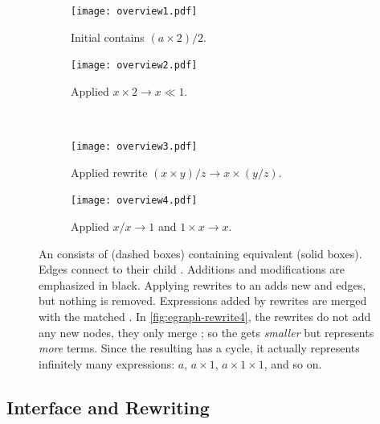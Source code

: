 \begin{figure}
  \begin{subfigure}[t]{0.45\linewidth}
    \centering
    \texttt{[image: overview1.pdf]}
    \caption{Initial \egraph contains ${(a \times 2) / 2}$.}
    \label{fig:egraph-rewrite1}
  \end{subfigure}
  \hfill
  \begin{subfigure}[t]{0.45\linewidth}
    \centering
    \texttt{[image: overview2.pdf]}
    \caption{
      Applied ${x \times 2 \to x \ll 1}$.
    }\label{fig:egraph-rewrite2}
  \end{subfigure}
  \\[1em]
  \begin{subfigure}[t]{0.45\linewidth}
    \centering
    \texttt{[image: overview3.pdf]}
    \caption{
      Applied rewrite ${(x \times y) / z \to x \times (y / z)}$.
    }\label{fig:egraph-rewrite3}
  \end{subfigure}
  \hfill
  \begin{subfigure}[t]{0.45\linewidth}
    \centering
    \texttt{[image: overview4.pdf]}
    \caption{
      Applied ${x / x \to 1}$ and ${1 \times x \to x}$.
    }\label{fig:egraph-rewrite4}
  \end{subfigure}
  \caption{
    An \egraph consists of \eclasses (dashed boxes) containing
      equivalent \enodes (solid boxes).
    Edges connect \enodes to their child \eclasses.
    Additions and modifications are emphasized in black.
    Applying rewrites to an \egraph adds new \enodes and edges,
      but nothing is removed.
    Expressions added by rewrites are merged with the matched \eclass.
    In \autoref{fig:egraph-rewrite4}, the rewrites do not add any new nodes,
      they only merge \eclasses;
      so the \egraph gets \emph{smaller} but represents \emph{more} terms.
    Since the resulting \egraph has a cycle,
      it actually represents infinitely many expressions:
      $a$, $a \times 1$, $a \times 1 \times 1$, and so on.
  }
  \label{fig:egraph-rewrite}
\end{figure}

\subsection{Interface and Rewriting}
\label{sec:interface}

